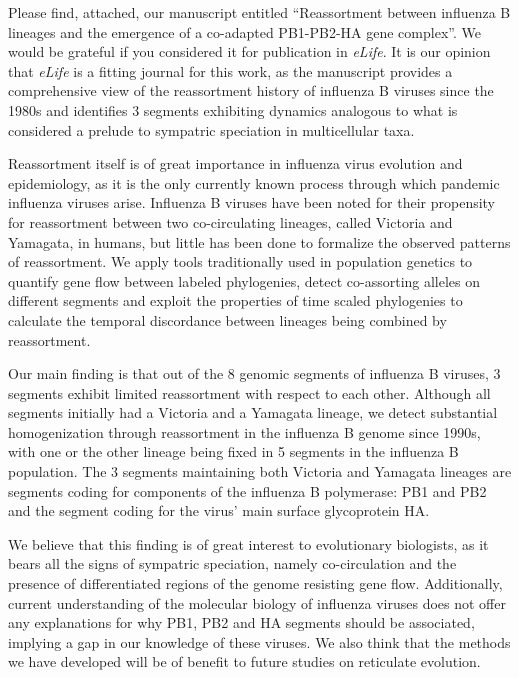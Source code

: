 \documentclass[stdletter,letterpaper,addrfromright,orderfromdateto,dateleft,11pt,noaddrto,sigleft]{newlfm}
\begin{document}
\begin{newlfm}
Please find, attached, our manuscript entitled ``Reassortment between influenza B lineages and the emergence of a co-adapted PB1-PB2-HA gene complex''.
We would be grateful if you considered it for publication in \textit{eLife}.
It is our opinion that \textit{eLife} is a fitting journal for this work, as the manuscript provides a comprehensive view of the reassortment history of influenza B viruses since the 1980s and identifies 3 segments exhibiting dynamics analogous to what is considered a prelude to sympatric speciation in multicellular taxa.

Reassortment itself is of great importance in influenza virus evolution and epidemiology, as it is the only currently known process through which pandemic influenza viruses arise.
Influenza B viruses have been noted for their propensity for reassortment between two co-circulating lineages, called Victoria and Yamagata, in humans, but little has been done to formalize the observed patterns of reassortment.
We apply tools traditionally used in population genetics to quantify gene flow between labeled phylogenies, detect co-assorting alleles on different segments and exploit the properties of time scaled phylogenies to calculate the temporal discordance between lineages being combined by reassortment.

Our main finding is that out of the 8 genomic segments of influenza B viruses, 3 segments exhibit limited reassortment with respect to each other.
Although all segments initially had a Victoria and a Yamagata lineage, we detect substantial homogenization through reassortment in the influenza B genome since 1990s, with one or the other lineage being fixed in 5 segments in the influenza B population.
The 3 segments maintaining both Victoria and Yamagata lineages are segments coding for components of the influenza B polymerase: PB1 and PB2 and the segment coding for the virus' main surface glycoprotein HA.

We believe that this finding is of great interest to evolutionary biologists, as it bears all the signs of sympatric speciation, namely co-circulation and the presence of differentiated regions of the genome resisting gene flow.
Additionally, current understanding of the molecular biology of influenza viruses does not offer any explanations for why PB1, PB2 and HA segments should be associated, implying a gap in our knowledge of these viruses.
We also think that the methods we have developed will be of benefit to future studies on reticulate evolution.

\end{newlfm}
\end{document}
